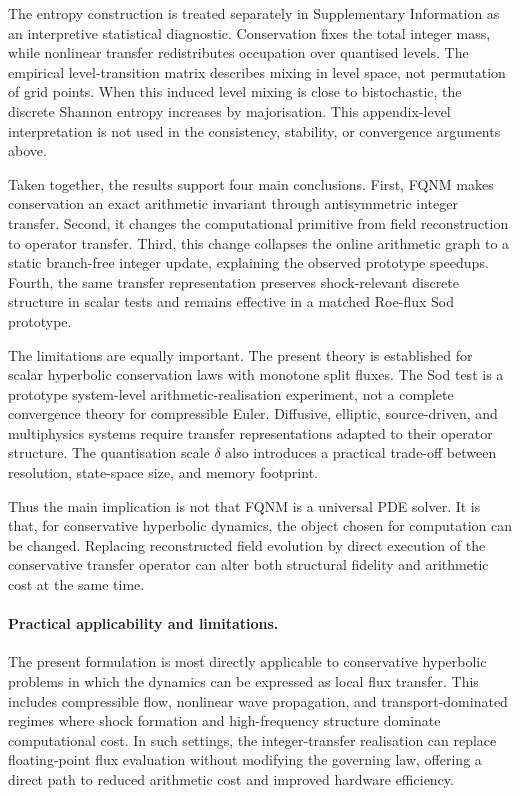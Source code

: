\documentclass[sn-basic]{sn-jnl}
\theoremstyle{plain}
\theoremstyle{remark}
\begin{document}
The entropy construction is treated separately in Supplementary Information as an interpretive statistical diagnostic. Conservation fixes the total integer mass, while nonlinear transfer redistributes occupation over quantised levels. The empirical level-transition matrix describes mixing in level space, not permutation of grid points. When this induced level mixing is close to bistochastic, the discrete Shannon entropy increases by majorisation. This appendix-level interpretation is not used in the consistency, stability, or convergence arguments above.

Taken together, the results support four main conclusions. First, FQNM makes conservation an exact arithmetic invariant through antisymmetric integer transfer. Second, it changes the computational primitive from field reconstruction to operator transfer. Third, this change collapses the online arithmetic graph to a static branch-free integer update, explaining the observed prototype speedups. Fourth, the same transfer representation preserves shock-relevant discrete structure in scalar tests and remains effective in a matched Roe-flux Sod prototype.

The limitations are equally important. The present theory is established for scalar hyperbolic conservation laws with monotone split fluxes. The Sod test is a prototype system-level arithmetic-realisation experiment, not a complete convergence theory for compressible Euler. Diffusive, elliptic, source-driven, and multiphysics systems require transfer representations adapted to their operator structure. The quantisation scale \(\delta\) also introduces a practical trade-off between resolution, state-space size, and memory footprint.

Thus the main implication is not that FQNM is a universal PDE solver. It is that, for conservative hyperbolic dynamics, the object chosen for computation can be changed. Replacing reconstructed field evolution by direct execution of the conservative transfer operator can alter both structural fidelity and arithmetic cost at the same time.

\paragraph{Practical applicability and limitations.}

The present formulation is most directly applicable to conservative hyperbolic problems in which the dynamics can be expressed as local flux transfer. This includes compressible flow, nonlinear wave propagation, and transport-dominated regimes where shock formation and high-frequency structure dominate computational cost. In such settings, the integer-transfer realisation can replace floating-point flux evaluation without modifying the governing law, offering a direct path to reduced arithmetic cost and improved hardware efficiency.
\end{document}
